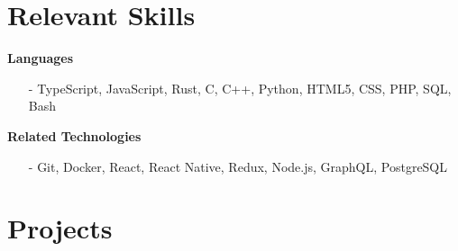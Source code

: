 \documentclass[margin,line]{res}
\begin{document}
\begin{resume}
\section{\sc Relevant Skills}
  {\bf Languages}
  \begin{itemize} \itemsep -2pt
    \item[-] TypeScript, JavaScript, Rust, C, C++, Python, HTML5, CSS, PHP, SQL, Bash
  \end{itemize}
  {\bf Related Technologies}
  \begin{itemize} \itemsep -2pt
    \item[-] Git, Docker, React, React Native, Redux, Node.js, GraphQL, PostgreSQL
  \end{itemize}

\section{\sc Projects}


\end{resume}
\end{document}
